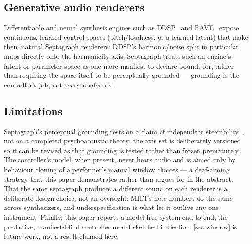\subsection{Generative audio renderers}
Differentiable and neural synthesis engines such as
DDSP~\cite{engel2020ddsp} and RAVE~\cite{caillonesling2021} expose
continuous, learned control spaces (pitch/loudness, or a learned latent)
that make them natural Septagraph renderers: DDSP's harmonic/noise split
in particular maps directly onto the harmonicity axis. Septagraph treats
such an engine's latent or parameter space as one more manifest to
declare bounds for, rather than requiring the space itself to be
perceptually grounded --- grounding is the controller's job, not every
renderer's.

\subsection{Limitations}
Septagraph's perceptual grounding rests on a claim of independent
steerability~\cite{shamma,mcdermott,wessel1979,grey1977}, not on a
completed psychoacoustic theory; the axis set is deliberately
versioned so it can be revised as that grounding is tested rather than
frozen prematurely. The controller's model, when present, never hears
audio and is aimed only by behaviour cloning of a performer's manual
window choices --- a deaf-aiming strategy that this paper demonstrates
rather than argues for in the abstract. That the same septagraph produces
a different sound on each renderer is a deliberate design choice, not an
oversight: MIDI's note numbers do the same across synthesizers, and
underspecification is what let it outlive any one instrument. Finally,
this paper reports a model-free system end to end; the predictive,
manifest-blind controller model sketched in Section~\ref{sec:window} is
future work, not a result claimed here.
